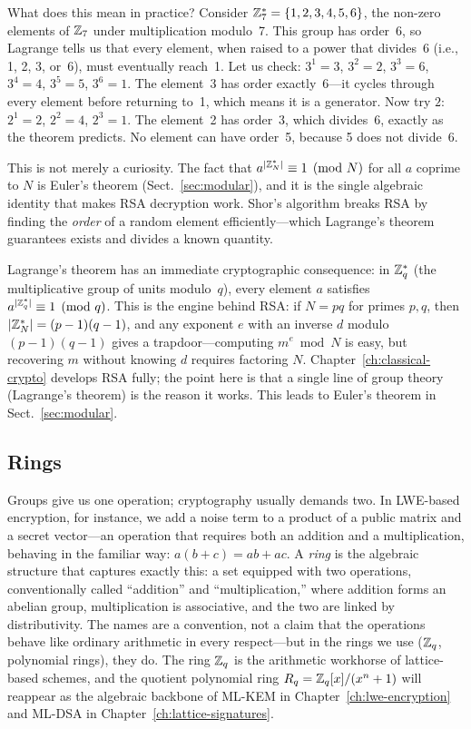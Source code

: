 What does this mean in practice?  Consider $\mathbb{Z}_7^* = \{1,2,3,4,5,6\}$, the non-zero elements of $\mathbb{Z}_7$ under multiplication modulo~7.  This group has order~6, so Lagrange tells us that every element, when raised to a power that divides~6 (i.e., 1, 2, 3, or~6), must eventually reach~1.  Let us check: $3^1 = 3$, $3^2 = 2$, $3^3 = 6$, $3^4 = 4$, $3^5 = 5$, $3^6 = 1$.  The element~3 has order exactly~6---it cycles through every element before returning to~1, which means it is a generator.  Now try $2$: $2^1 = 2$, $2^2 = 4$, $2^3 = 1$.  The element~2 has order~3, which divides~6, exactly as the theorem predicts.  No element can have order~5, because 5 does not divide~6.

This is not merely a curiosity.  The fact that $a^{|\mathbb{Z}_N^*|} \equiv 1 \pmod{N}$ for all $a$ coprime to $N$ is Euler's theorem (Sect.~\ref{sec:modular}), and it is the single algebraic identity that makes RSA decryption work.  Shor's algorithm breaks RSA by finding the \emph{order} of a random element efficiently---which Lagrange's theorem guarantees exists and divides a known quantity.

Lagrange's theorem has an immediate cryptographic consequence: in $\mathbb{Z}_q^*$ (the multiplicative group of units modulo~$q$), every element $a$ satisfies $a^{|\mathbb{Z}_q^*|} \equiv 1 \pmod{q}$.  This is the engine behind RSA: if $N = pq$ for primes $p, q$, then $|\mathbb{Z}_N^*| = (p-1)(q-1)$, and any exponent $e$ with an inverse $d$ modulo $(p-1)(q-1)$ gives a trapdoor---computing $m^e \bmod N$ is easy, but recovering $m$ without knowing $d$ requires factoring $N$.  Chapter~\ref{ch:classical-crypto} develops RSA fully; the point here is that a single line of group theory (Lagrange's theorem) is the reason it works.  This leads to Euler's theorem in Sect.~\ref{sec:modular}.


\subsection{Rings}
\label{subsec:rings}

Groups give us one operation; cryptography usually demands two.  In LWE-based encryption, for instance, we add a noise term to a product of a public matrix and a secret vector---an operation that requires both an addition and a multiplication, behaving in the familiar way: $a(b+c) = ab + ac$.  A \emph{ring} is the algebraic structure that captures exactly this: a set equipped with two operations, conventionally called ``addition'' and ``multiplication,'' where addition forms an abelian group, multiplication is associative, and the two are linked by distributivity.  The names are a convention, not a claim that the operations behave like ordinary arithmetic in every respect---but in the rings we use ($\mathbb{Z}_q$, polynomial rings), they do.  The ring $\mathbb{Z}_q$ is the arithmetic workhorse of lattice-based schemes, and the quotient polynomial ring $R_q = \mathbb{Z}_q[x]/(x^n+1)$ will reappear as the algebraic backbone of ML-KEM in Chapter~\ref{ch:lwe-encryption} and ML-DSA in Chapter~\ref{ch:lattice-signatures}.


